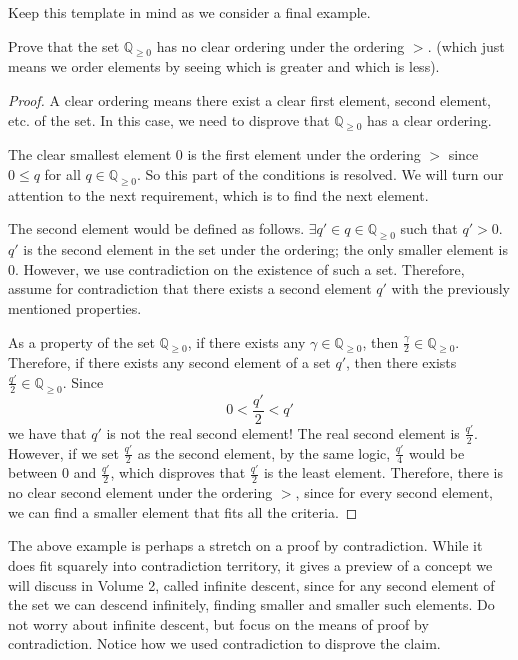 Keep this template in mind as we consider a final example.

\begin{example}
Prove that the set $\mathbb{Q}_{\geq 0}$ has no clear ordering under the ordering $>$. (which just means we order elements by seeing which is greater and which is less).
\end{example}
\begin{proof}
A clear ordering means there exist a clear first element, second element, etc. of the set. In this case, we need to disprove that $\mathbb{Q}_{\geq 0}$ has a clear ordering. 

The clear smallest element $0$ is the first element under the ordering $>$ since $0 \leq q$ for all $q \in \mathbb{Q}_{\geq 0}$. So this part of the conditions is resolved. We will turn our attention to the next requirement, which is to find the next element. 

The second element would be defined as follows. $\exists q' \in q \in \mathbb{Q}_{\geq 0}$ such that $q' > 0$. $q'$ is the second element in the set under the ordering; the only smaller element is $0$. However, we use contradiction on the existence of such a set. Therefore, assume for contradiction that there exists a second element $q'$ with the previously mentioned properties.

As a property of the set $\mathbb{Q}_{\geq 0}$, if there exists any $\gamma \in \mathbb{Q}_{\geq 0}$, then $\frac{\gamma}{2} \in \mathbb{Q}_{\geq 0}$. Therefore, if there exists any second element of a set $q'$, then there exists $\frac{q'}{2} \in \mathbb{Q}_{\geq 0}$. Since 
\[
0 < \frac{q'}{2} < q'
\]
we have that $q'$ is not the real second element! The real second element is $\frac{q'}{2}$. However, if we set $\frac{q'}{2}$ as the second element, by the same logic, $\frac{q'}{4}$ would be between $0$ and $\frac{q'}{2}$, which disproves that $\frac{q'}{2}$ is the least element. Therefore, there is no clear second element under the ordering $>$, since for every second element, we can find a smaller element that fits all the criteria. 
\end{proof}

The above example is perhaps a stretch on a proof by contradiction. While it does fit squarely into contradiction territory, it gives a preview of a concept we will discuss in Volume 2, called infinite descent, since for any second element of the set we can descend infinitely, finding smaller and smaller such elements. Do not worry about infinite descent, but focus on the means of proof by contradiction. Notice how we used contradiction to disprove the claim.

